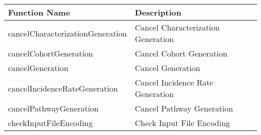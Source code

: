 \documentclass[
]{article}
\begin{document}
\begin{longtable}[]{@{}ll@{}}
\toprule
\begin{minipage}[b]{0.46\columnwidth}\raggedright
Function Name\strut
\end{minipage} & \begin{minipage}[b]{0.48\columnwidth}\raggedright
Description\strut
\end{minipage}\tabularnewline
\midrule
\endhead
\begin{minipage}[t]{0.46\columnwidth}\raggedright
cancelCharacterizationGeneration\strut
\end{minipage} & \begin{minipage}[t]{0.48\columnwidth}\raggedright
Cancel Characterization Generation\strut
\end{minipage}\tabularnewline
\begin{minipage}[t]{0.46\columnwidth}\raggedright
cancelCohortGeneration\strut
\end{minipage} & \begin{minipage}[t]{0.48\columnwidth}\raggedright
Cancel Cohort Generation\strut
\end{minipage}\tabularnewline
\begin{minipage}[t]{0.46\columnwidth}\raggedright
cancelGeneration\strut
\end{minipage} & \begin{minipage}[t]{0.48\columnwidth}\raggedright
Cancel Generation\strut
\end{minipage}\tabularnewline
\begin{minipage}[t]{0.46\columnwidth}\raggedright
cancelIncidenceRateGeneration\strut
\end{minipage} & \begin{minipage}[t]{0.48\columnwidth}\raggedright
Cancel Incidence Rate Generation\strut
\end{minipage}\tabularnewline
\begin{minipage}[t]{0.46\columnwidth}\raggedright
cancelPathwayGeneration\strut
\end{minipage} & \begin{minipage}[t]{0.48\columnwidth}\raggedright
Cancel Pathway Generation\strut
\end{minipage}\tabularnewline
\begin{minipage}[t]{0.46\columnwidth}\raggedright
checkInputFileEncoding\strut
\end{minipage} & \begin{minipage}[t]{0.48\columnwidth}\raggedright
Check Input File Encoding\strut
\end{minipage}\tabularnewline

\end{longtable}
\end{document}
